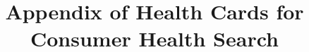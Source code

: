 \documentclass[sigconf]{acmart}
\begin{document}


\title[Health Card for CHS]{Appendix of Health Cards for Consumer Health Search}


%
%
%





%
\maketitle
%
%
%
%
%
%
%
\end{document}
